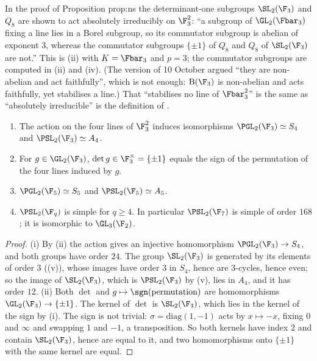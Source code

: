 \begin{paperlink}
In the proof of Proposition prop:ns the determinant-one subgroups $\SL_2(\F_3)$ and $Q_8$ are shown to act absolutely irreducibly on $\F_3^2$: ``a subgroup
of $\GL_2(\Fbar_3)$ fixing a line lies in a Borel subgroup, so its commutator subgroup is abelian of exponent $3$, whereas the commutator subgroups $\{\pm1\}$ of
$Q_8$ and $Q_8$ of $\SL_2(\F_3)$ are not.'' This is (ii) with $K=\Fbar_3$ and $p=3$; the commutator subgroups are computed in
(ii) and (iv). (The version of 10 October argued ``they are non-abelian and act faithfully'', which is not
enough: $\mathrm B(\F_3)$ is non-abelian and acts faithfully, yet stabilises a line.) That ``stabilises no line of $\Fbar_3^2$'' is the same as ``absolutely
irreducible'' is the definition of .
\end{paperlink}

\begin{theorem}\label{thm:groups:smallpgl}
\begin{enumerate}[label=(\roman*)]
\item The action on the four lines of $\F_3^2$ induces isomorphisms $\PGL_2(\F_3)\simeq S_4$ and $\PSL_2(\F_3)\simeq A_4$.
\item For $g\in\GL_2(\F_3)$, $\det g\in\F_3^\times=\{\pm1\}$ equals the sign of the permutation of the four lines induced by $g$.
\item $\PGL_2(\F_5)\simeq S_5$ and $\PSL_2(\F_5)\simeq A_5$.
\item $\PSL_2(\F_q)$ is simple for $q\ge4$. In particular $\PSL_2(\F_7)$ is simple of order $168$; it is isomorphic to $\GL_3(\F_2)$.
\end{enumerate}
\end{theorem}

\begin{proof}
(i) By (ii) the action gives an injective homomorphism $\PGL_2(\F_3)\to S_4$, and both groups have order $24$. The group $\SL_2(\F_3)$
is generated by its elements of order $3$ ((v)), whose images have order $3$ in $S_4$, hence are $3$-cycles, hence even; so the image
of $\SL_2(\F_3)$, which is $\PSL_2(\F_3)$ by (v), lies in $A_4$, and it has order $12$. (ii) Both $\det$ and $g\mapsto\sgn(\text{permutation})$ are
homomorphisms $\GL_2(\F_3)\to\{\pm1\}$. The kernel of $\det$ is $\SL_2(\F_3)$, which lies in the kernel of the sign by (i). The sign is not trivial: $\sigma=\mathrm{diag}(1,-1)$
acts by $x\mapsto-x$, fixing $0$ and $\infty$ and swapping $1$ and $-1$, a transposition. So both kernels have index $2$ and contain $\SL_2(\F_3)$, hence are equal to it,
and two homomorphisms onto $\{\pm1\}$ with the same kernel are equal.
\end{proof}

